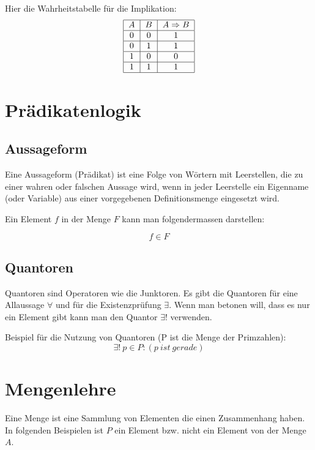 \documentclass[12pt, a4paper, oneside]{article}
\begin{document}
Hier die Wahrheitstabelle für die Implikation:
\begin{equation}
  \begin{tabular}{|c|c|c|}
    \hline
    $A$ & $B$ & $A \Rightarrow B$ \\ \hline
    0 & 0 & 1 \\ \hline
    0 & 1 & 1 \\ \hline
    1 & 0 & 0 \\ \hline
    1 & 1 & 1 \\ \hline
  \end{tabular}
\end{equation}

\newpage
\section{Prädikatenlogik}
\subsection{Aussageform}
Eine Aussageform (Prädikat) ist eine Folge von Wörtern mit Leerstellen, die zu einer wahren oder falschen Aussage wird, wenn in jeder Leerstelle ein Eigenname (oder Variable) aus einer vorgegebenen Definitionsmenge eingesetzt wird.

Ein Element $f$ in der Menge $F$ kann man folgendermassen darstellen:

\begin{equation}
  f \in F
\end{equation}

\subsection{Quantoren}
Quantoren sind Operatoren wie die Junktoren. Es gibt die Quantoren für eine Allaussage $\forall$ und für die Existenzprüfung $\exists$. Wenn man betonen will, dass es nur ein Element gibt kann man den Quantor $\exists!$ verwenden.

Beispiel für die Nutzung von Quantoren (P ist die Menge der Primzahlen):
\begin{equation}
  \exists!\ p \in P : (p\ ist\ gerade)
\end{equation}

\newpage
\section{Mengenlehre}
Eine Menge ist eine Sammlung von Elementen die einen Zusammenhang haben. In folgenden Beispielen ist $P$ ein Element bzw. nicht ein Element von der Menge $A$.
 
\end{document}
